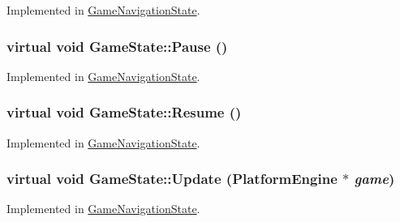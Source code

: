 Implemented in \hyperlink{class_game_navigation_state_8f613860bf544476ab9cff9fb7f98201}{GameNavigationState}.\hypertarget{class_game_state_1f4d2b5a2e4dcb7645e3e7a5735926a6}{
\subsubsection[{Pause}]{\setlength{\rightskip}{0pt plus 5cm}virtual void GameState::Pause ()}}
\label{dd/d87/class_game_state_1f4d2b5a2e4dcb7645e3e7a5735926a6}




Implemented in \hyperlink{class_game_navigation_state_ac626b511de8af9f32b7a1492a10f861}{GameNavigationState}.\hypertarget{class_game_state_cf9bcd5b47ebb3f572389f64c5ca5ed4}{
\subsubsection[{Resume}]{\setlength{\rightskip}{0pt plus 5cm}virtual void GameState::Resume ()}}
\label{dd/d87/class_game_state_cf9bcd5b47ebb3f572389f64c5ca5ed4}




Implemented in \hyperlink{class_game_navigation_state_4d6aee55eddb1978f493206d985fb950}{GameNavigationState}.\hypertarget{class_game_state_100ca49bc95afce1d5c5b756708bbc2b}{
\subsubsection[{Update}]{\setlength{\rightskip}{0pt plus 5cm}virtual void GameState::Update ({\bf PlatformEngine} $\ast$ {\em game})}}
\label{dd/d87/class_game_state_100ca49bc95afce1d5c5b756708bbc2b}




Implemented in \hyperlink{class_game_navigation_state_90f5e6d6287a875d8f2737180f46a004}{GameNavigationState}.